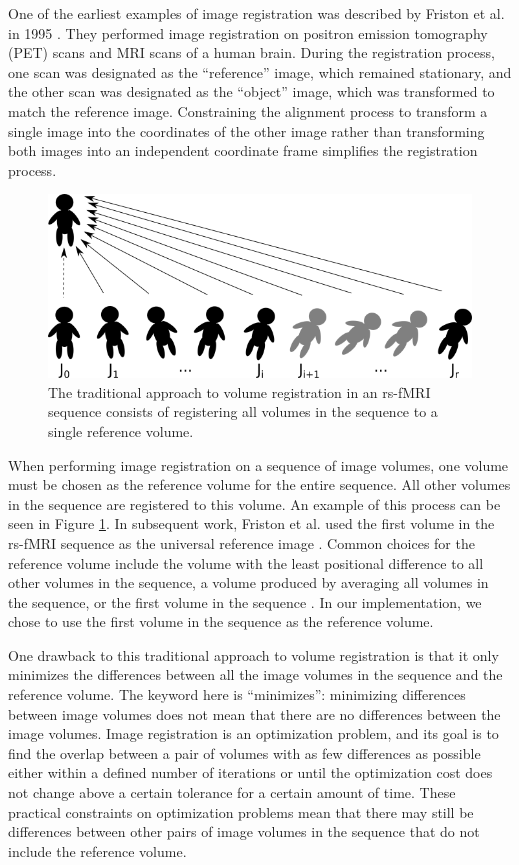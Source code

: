 One of the earliest examples of image registration was described by Friston et al. in 1995 \cite{Friston1995}. They performed image registration on positron emission tomography (PET) scans and MRI scans of a human brain. During the registration process, one scan was designated as the ``reference'' image, which remained stationary, and the other scan was designated as the ``object'' image, which was transformed to match the reference image. Constraining the alignment process to transform a single image into the coordinates of the other image rather than transforming both images into an independent coordinate frame simplifies the registration process.

\begin{figure}
\centering
\includegraphics[width=.7\textwidth]{2/traditional-registration.png}
\caption{The traditional approach to volume registration in an rs-fMRI sequence consists of registering all volumes in the sequence to a single reference volume.}
\label{fig:ch4:traditional-reg}
\end{figure}

When performing image registration on a sequence of image volumes, one volume must be chosen as the reference volume for the entire sequence. All other volumes in the sequence are registered to this volume. An example of this process can be seen in Figure \ref{fig:ch4:traditional-reg}. In subsequent work, Friston et al. used the first volume in the rs-fMRI sequence as the universal reference image \cite{Friston1996}. Common choices for the reference volume include the volume with the least positional difference to all other volumes in the sequence, a volume produced by averaging all volumes in the sequence, or the first volume in the sequence \cite{Friston1996} \cite{Liao2005}. In our implementation, we chose to use the first volume in the sequence as the reference volume.

One drawback to this traditional approach to volume registration is that it only minimizes the differences between all the image volumes in the sequence and the reference volume. The keyword here is ``minimizes'': minimizing differences between image volumes does not mean that there are no differences between the image volumes. Image registration is an optimization problem, and its goal is to find the overlap between a pair of volumes with as few differences as possible either within a defined number of iterations or until the optimization cost does not change above a certain tolerance for a certain amount of time. These practical constraints on optimization problems mean that there may still be differences between other pairs of image volumes in the sequence that do not include the reference volume. 

